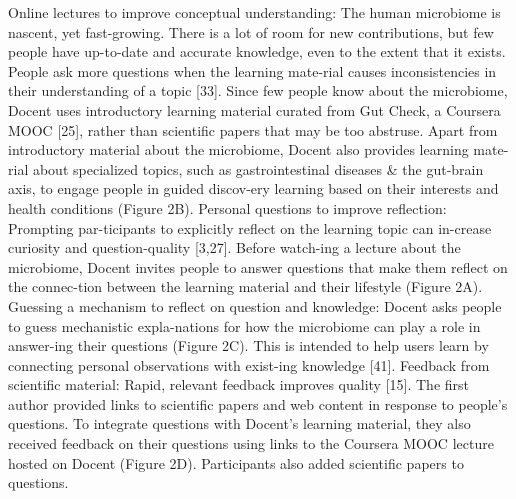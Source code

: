 Online lectures to improve conceptual understanding: The human microbiome is nascent, yet fast-growing. There is a lot of room for new contributions, but few people have up-to-date and accurate knowledge, even to the extent that it exists. People ask more questions when the learning mate-rial causes inconsistencies in their understanding of a topic [33]. Since few people know about the microbiome, Docent uses introductory learning material curated from Gut Check, a Coursera MOOC [25], rather than scientific papers that may be too abstruse. Apart from introductory material about the microbiome, Docent also provides learning mate-rial about specialized topics, such as gastrointestinal diseases \& the gut-brain axis, to engage people in guided discov-ery learning based on their interests and health conditions (Figure 2B).
 Personal questions to improve reflection: Prompting par-ticipants to explicitly reflect on the learning topic can in-crease curiosity and question-quality [3,27]. Before watch-ing a lecture about the microbiome, Docent invites people to answer questions that make them reflect on the connec-tion between the learning material and their lifestyle (Figure 2A).
Guessing a mechanism to reflect on question and knowledge: Docent asks people to guess mechanistic expla-nations for how the microbiome can play a role in answer-ing their questions (Figure 2C). This is intended to help users learn by connecting personal observations with exist-ing knowledge [41].
Feedback from scientific material: Rapid, relevant feedback improves quality [15]. The first author provided links to scientific papers and web content in response to people’s questions. To integrate questions with Docent’s learning material, they also received feedback on their questions using links to the Coursera MOOC lecture hosted on Docent (Figure 2D). Participants also added scientific papers to questions. 

